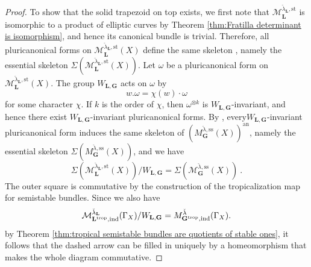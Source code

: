 \documentclass[10pt, a4paper]{amsart}
\theoremstyle{definition}
\theoremstyle{myitemstyle}
\newcommand{\lambdacheck}{\check{\lambda}}
\newcommand{\bfG}{\mathbf{G}}
\newcommand{\bfL}{\mathbf{L}}
\newcommand{\mc}[1]{{\mathcal{#1}}}
\newcommand{\an}{\mathrm{an}}
\newcommand{\st}{\mathrm{st}}
\newcommand{\semist}{\mathrm{ss}}
\newcommand{\ind}{\mathrm{ind}}
\newcommand{\trop}{{\mathrm{trop}}}
\newcommand{\Ga}{\Gamma}
\begin{document}
\begin{proof}
To show that the solid trapezoid on top exists, we first note that $\mc M_{\mathbf L}^{\lambdacheck_{\mathbf L},\st}$ is isomorphic to a product of elliptic curves by Theorem \ref{thm:Fratilla determinant is isomorphism}, and hence its canonical bundle is trivial. Therefore, all pluricanonical forms on $\mc M_{\mathbf L}^{\lambdacheck_{\mathbf L},\st}(X)$ define the same skeleton \cite[Proposition 4.4.5 (5)]{MustataNicaise}, namely the essential skeleton $\Sigma(\mc M_{\mathbf L}^{\lambdacheck_{\mathbf L},\st}(X))$. 
Let $\omega$ be a pluricanonical form on $\mc M_{\mathbf L}^{\lambdacheck_{\mathbf L},\st}(X)$. The group $W_{\bfL,\bfG}$ acts on $\omega$ by 
\[
w.\omega= \chi(w)\cdot\omega 
\]
for some character $\chi$. If $k$ is the order of $\chi$, then $\omega^{\otimes k}$ is $W_{\bfL,\bfG}$-invariant, and hence there exist $W_{\bfL,\bfG}$-invariant pluricanonical forms. By \cite[Proposition 6.1.9]{BrownMazzon}, every$W_{\bfL,\bfG}$-invariant pluricanonical form induces the same skeleton of $\left(M_{\mathbf{G}}^{\lambdacheck,\semist}(X)\right)^\an$, namely the essential skeleton $\Sigma(M_{\mathbf{G}}^{\lambdacheck,\semist}(X))$, and we have 
\[
    \Sigma(\mc M_{\mathbf{L}}^{\lambdacheck_\mathbf{L},\st}(X))/W_{\mathbf{L},\mathbf{G}}= \Sigma(\mc M_{\mathbf{G}}^{\lambdacheck,\semist}(X)) \ .
\]
The outer square is commutative by the construction of the tropicalization map for semistable bundles. Since we also have
\[
    \mc M_{\mathbf{L}^\trop,\ind}^{\lambdacheck_\mathbf{L}}(\Ga_X) /W_{\mathbf{L},\mathbf{G}} = \mc \mc M_{\mathbf{G}^\trop,\ind}^{\lambdacheck}(\Ga_X).
\]
by Theorem \ref{thm:tropical semistable bundles are quotients of stable ones}, it follows that the dashed arrow can be filled in uniquely by a homeomorphism that makes the whole diagram commutative.
\end{proof}







{}
\end{document}
